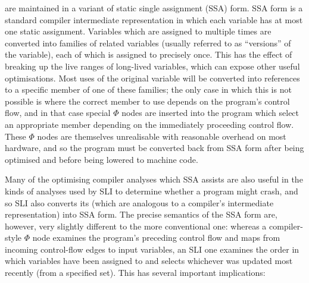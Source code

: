 \STateMachines are maintained in a variant of static single assignment
(SSA) form.  SSA form is a standard compiler intermediate
representation in which each variable has at most one static
assignment\needCite{}.  Variables which are assigned to multiple times
are converted into families of related variables (usually referred to
as ``versions'' of the variable), each of which is assigned to
precisely once.  This has the effect of breaking up the live ranges of
long-lived variables, which can expose other useful optimisations.
Most uses of the original variable will be converted into references
to a specific member of one of these families; the only case in which
this is not possible is where the correct member to use depends on the
program's control flow, and in that case special $\Phi$ nodes are
inserted into the program which select an appropriate member depending
on the immediately proceeding control flow.  These $\Phi$ nodes are
themselves unrealisable with reasonable overhead on most hardware, and
so the program must be converted back from SSA form after being
optimised and before being lowered to machine code.

Many of the optimising compiler analyses which SSA assists are also
useful in the kinds of analyses used by SLI to determine whether a
program might crash, and so SLI also converts its \StateMachines
(which are analogous to a compiler's intermediate representation) into
SSA form.  The precise semantics of the SSA form are, however, very
slightly different to the more conventional one: whereas a
compiler-style $\Phi$ node examines the program's preceding control
flow and maps from incoming control-flow edges to input variables, an
SLI one examines the order in which variables have been assigned to
and selects whichever was updated most recently (from a specified
set).  This has several important implications:


